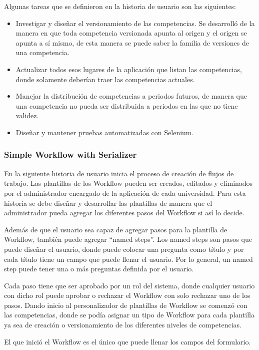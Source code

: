Algunas tareas que se definieron en la historia de usuario son las siguientes:
\begin{itemize}
	\item Investigar y diseñar el versionamiento de las competencias. Se desarrolló de la manera en que toda competencia versionada apunta al origen y el origen se apunta a sí mismo, de esta manera se puede saber la familia de versiones de una competencia.
	\item Actualizar todos esos lugares de la aplicación que listan las competencias, donde solamente deberían traer las competencias actuales.
	\item Manejar la distribución de competencias a periodos futuros, de manera que una competencia no pueda ser distribuida a periodos en las que no tiene validez.
	\item Diseñar y mantener pruebas automatizadas con Selenium.
\end{itemize}

\subsubsection{Simple Workflow with Serializer}
En la siguiente historia de usuario inicia el proceso de creación de flujos de trabajo. Las plantillas de los Workflow pueden ser creados, editados y eliminados por el administrador encargado de la aplicación de cada universidad. Para esta historia se debe diseñar y desarrollar las plantillas de manera que el administrador pueda agregar los diferentes pasos del Workflow si así lo decide.

Además de que el usuario sea capaz de agregar pasos para la plantilla de Workflow, también puede agregar “named steps”. Los named steps son pasos que puede diseñar el usuario, donde puede colocar una pregunta como título y por cada título tiene un campo que puede llenar el usuario. Por lo general, un named step puede tener una o más preguntas definida por el usuario.

Cada paso tiene que ser aprobado por un rol del sistema, donde cualquier usuario con dicho rol puede aprobar o rechazar el Workflow con solo rechazar uno de los pasos. Dando inicio al personalizador de plantillas de Workflow se comenzó con las competencias, donde se podía asignar un tipo de Workflow para cada plantilla ya sea de creación o versionamiento de los diferentes niveles de competencias.

El que inició el Workflow es el único que puede llenar los campos del formulario.

